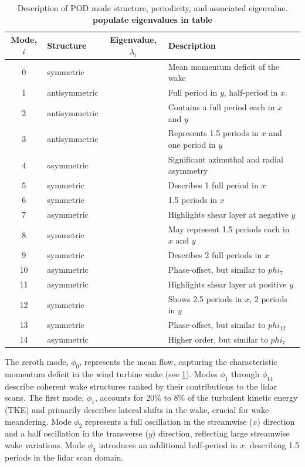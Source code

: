\documentclass[%
 aip,
 amsmath,
 amssymb,
]{revtex4-2}
\newcommand{\comment}[1]{\textbf{\textcolor{red!50!black}{#1}}}
\begin{document}
\begin{table}[]
  \caption{Description of POD mode structure, periodicity, and associated eigenvalue. \comment{populate eigenvalues in table}}
  \label{tab:pod_modes}
  \begin{tabular}{clcp{8cm}}
  Mode, $i$ & Structure     & Eigenvalue, $\lambda_i$ & Description \\
  \hline
  0           & symmetric     &            & Mean momentum deficit of the wake\\
  1           & antisymmetric &            & Full period in $y$, half-period in $x$. \\
  2           & antisymmetric &            & Contains a full period each in $x$ and $y$ \\
  3           & antisymmetric &            & Represents 1.5 periods in $x$ and one period in $y$ \\
  4           & asymmetric    &            & Significant azimuthal and radial asymmetry \\
  5           & symmetric     &            & Describes 1 full period in $x$\\
  6           & symmetric     &            & 1.5 periods in $x$\\
  7           & asymmetric    &            & Highlights shear layer at negative $y$  \\
  8           & symmetric     &            & May represent 1.5 periods each in $x$ and $y$ \\
  9           & symmetric     &            & Describes 2 full periods in $x$\\
  10          & asymmetric    &            & Phase-offset, but similar to $phi_7$ \\
  11          & asymmetric    &            & Highlights shear layer at positive $y$ \\
  12          & symmetric     &            & Shows 2.5 periods in $x$, 2 periods in $y$\\
  13          & symmetric     &            & Phase-offset, but similar to $phi_{12}$  \\
  14          & asymmetric    &            & Higher order, but similar to $phi_7$ \\
  \end{tabular}
\end{table}

The zeroth mode, $\phi_0$, represents the mean flow, capturing the characteristic momentum deficit in the wind turbine wake (see \cref{tab:pod_modes}).
Modes $\phi_1$ through $\phi_{14}$ describe coherent wake structures ranked by their contributions to the lidar scans.
The first mode, $\phi_1$, accounts for 20\% to 8\% of the turbulent kinetic energy (TKE) and primarily describes lateral shifts in the wake, crucial for wake meandering.
Mode $\phi_2$ represents a full oscillation in the streamwise ($x$) direction and a half oscillation in the transverse ($y$) direction, reflecting large streamwise wake variations.
Mode $\phi_3$ introduces an additional half-period in $x$, describing 1.5 periods in the lidar scan domain.
\end{document}
